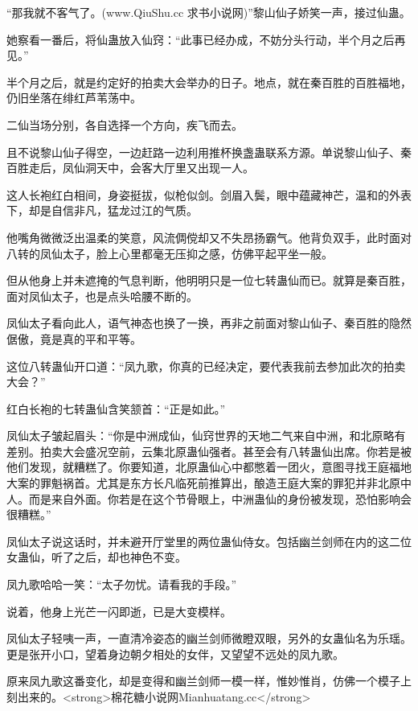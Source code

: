 
\begin{this_body}

“那我就不客气了。(www.QiuShu.cc 求书小说网)”黎山仙子娇笑一声，接过仙蛊。

她察看一番后，将仙蛊放入仙窍：“此事已经办成，不妨分头行动，半个月之后再见。”

半个月之后，就是约定好的拍卖大会举办的日子。地点，就在秦百胜的百胜福地，仍旧坐落在绯红芦苇荡中。

二仙当场分别，各自选择一个方向，疾飞而去。

且不说黎山仙子得空，一边赶路一边利用推杯换盏蛊联系方源。单说黎山仙子、秦百胜走后，凤仙洞天中，会客大厅里又出现一人。

这人长袍红白相间，身姿挺拔，似枪似剑。剑眉入鬓，眼中蕴藏神芒，温和的外表下，却是自信非凡，猛龙过江的气质。

他嘴角微微泛出温柔的笑意，风流倜傥却又不失昂扬霸气。他背负双手，此时面对八转的凤仙太子，脸上心里都毫无压抑之感，仿佛平起平坐一般。

但从他身上并未遮掩的气息判断，他明明只是一位七转蛊仙而已。就算是秦百胜，面对凤仙太子，也是点头哈腰不断的。

凤仙太子看向此人，语气神态也换了一换，再非之前面对黎山仙子、秦百胜的隐然倨傲，竟是真的平和平等。

这位八转蛊仙开口道：“凤九歌，你真的已经决定，要代表我前去参加此次的拍卖大会？”

红白长袍的七转蛊仙含笑颔首：“正是如此。”

凤仙太子皱起眉头：“你是中洲成仙，仙窍世界的天地二气来自中洲，和北原略有差别。拍卖大会盛况空前，云集北原蛊仙强者。甚至会有八转蛊仙出席。你若是被他们发现，就糟糕了。你要知道，北原蛊仙心中都憋着一团火，意图寻找王庭福地大案的罪魁祸首。尤其是东方长凡临死前推算出，酿造王庭大案的罪犯并非北原中人。而是来自外面。你若是在这个节骨眼上，中洲蛊仙的身份被发现，恐怕影响会很糟糕。”

凤仙太子说这话时，并未避开厅堂里的两位蛊仙侍女。包括幽兰剑师在内的这二位女蛊仙，听了之后，却也神色不变。

凤九歌哈哈一笑：“太子勿忧。请看我的手段。”

说着，他身上光芒一闪即逝，已是大变模样。

凤仙太子轻咦一声，一直清冷姿态的幽兰剑师微瞪双眼，另外的女蛊仙名为乐瑶。更是张开小口，望着身边朝夕相处的女伴，又望望不远处的凤九歌。

原来凤九歌这番变化，却是变得和幽兰剑师一模一样，惟妙惟肖，仿佛一个模子上刻出来的。<strong>棉花糖小说网Mianhuatang.cc</strong>


\end{this_body}
